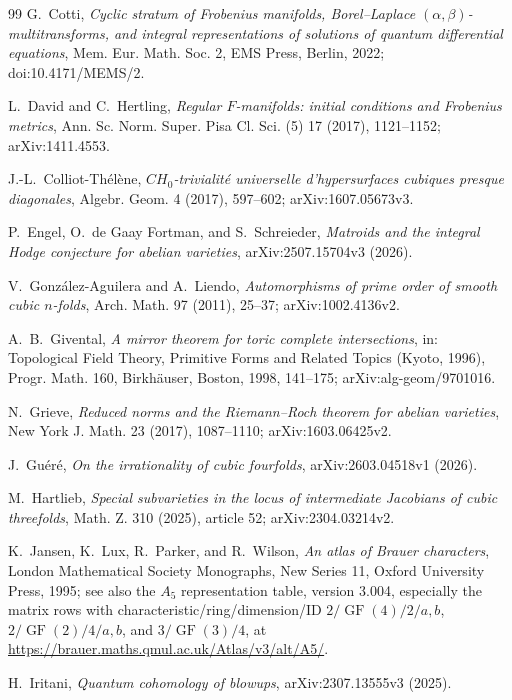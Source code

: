\documentclass[11pt]{article}
\numberwithin{equation}{section}
\theoremstyle{definition}
\theoremstyle{remark}
\begin{document}
\begin{thebibliography}{99}
G.~Cotti,
\emph{Cyclic stratum of Frobenius manifolds, Borel--Laplace
\((\alpha,\beta)\)-multitransforms, and integral representations of
solutions of quantum differential equations},
Mem. Eur. Math. Soc. 2, EMS Press, Berlin, 2022;
doi:10.4171/MEMS/2.

L.~David and C.~Hertling,
\emph{Regular \(F\)-manifolds: initial conditions and Frobenius metrics},
Ann. Sc. Norm. Super. Pisa Cl. Sci. (5) 17 (2017), 1121--1152;
arXiv:1411.4553.

J.-L.~Colliot-Th\'el\`ene,
\emph{\(CH_0\)-trivialit\'e universelle d'hypersurfaces cubiques presque
diagonales}, Algebr. Geom. 4 (2017), 597--602; arXiv:1607.05673v3.

P.~Engel, O.~de Gaay Fortman, and S.~Schreieder,
\emph{Matroids and the integral Hodge conjecture for abelian varieties},
arXiv:2507.15704v3 (2026).


V.~Gonz\'alez-Aguilera and A.~Liendo,
\emph{Automorphisms of prime order of smooth cubic \(n\)-folds},
Arch. Math. 97 (2011), 25--37; arXiv:1002.4136v2.

A.~B.~Givental,
\emph{A mirror theorem for toric complete intersections},
in: Topological Field Theory, Primitive Forms and Related Topics (Kyoto, 1996),
Progr. Math. 160, Birkh\"auser, Boston, 1998, 141--175;
arXiv:alg-geom/9701016.

N.~Grieve,
\emph{Reduced norms and the Riemann--Roch theorem for abelian varieties},
New York J. Math. 23 (2017), 1087--1110; arXiv:1603.06425v2.

J.~Gu\'er\'e,
\emph{On the irrationality of cubic fourfolds},
arXiv:2603.04518v1 (2026).

M.~Hartlieb,
\emph{Special subvarieties in the locus of intermediate Jacobians of cubic
threefolds}, Math. Z. 310 (2025), article 52; arXiv:2304.03214v2.

K.~Jansen, K.~Lux, R.~Parker, and R.~Wilson,
\emph{An atlas of Brauer characters}, London Mathematical Society Monographs,
New Series 11, Oxford University Press, 1995; see also the \(A_5\)
representation table, version 3.004, especially the matrix rows with
characteristic/ring/dimension/ID
\(2/\operatorname{GF}(4)/2/a,b\),
\(2/\operatorname{GF}(2)/4/a,b\), and
\(3/\operatorname{GF}(3)/4\), at
\url{https://brauer.maths.qmul.ac.uk/Atlas/v3/alt/A5/}.

H.~Iritani,
\emph{Quantum cohomology of blowups},
arXiv:2307.13555v3 (2025).


\end{thebibliography}
\end{document}
